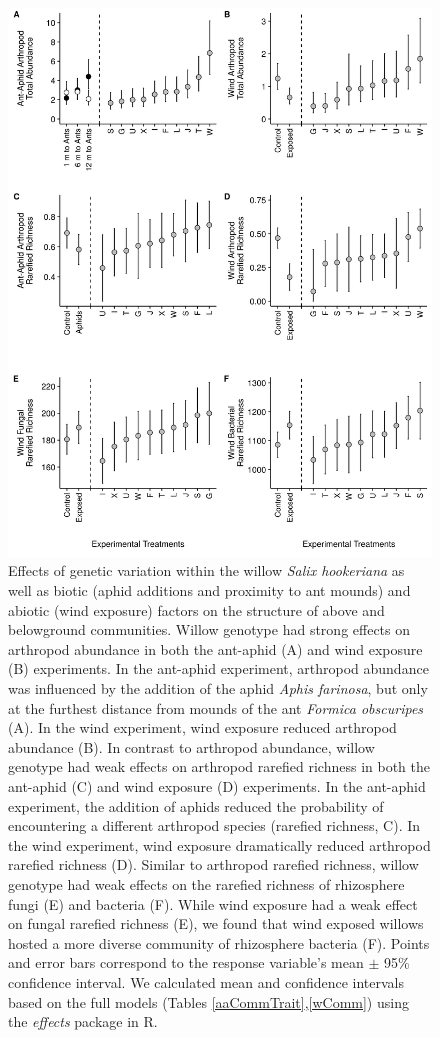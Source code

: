 \documentclass[11pt]{article}
\begin{document}
\begin{figure}%
\centering
\includegraphics[scale = 0.16]{fig_1.png}
\caption{Effects of genetic variation within the willow
\textit{Salix hookeriana} as well as biotic (aphid additions and proximity
to ant mounds) and abiotic (wind exposure) factors on the structure of
above and belowground communities. Willow genotype had strong effects on
arthropod abundance in both the ant-aphid (A) and wind exposure (B)
experiments. In the ant-aphid experiment, arthropod abundance was
influenced by the addition of the aphid \textit{Aphis farinosa}, but only
at the furthest distance from mounds of the ant \textit{Formica
obscuripes} (A). In the wind experiment, wind exposure reduced arthropod
abundance (B). In contrast to arthropod abundance, willow genotype had weak
effects on arthropod rarefied richness in both the ant-aphid (C) and
wind exposure (D) experiments. In the ant-aphid experiment, the
addition of aphids reduced the probability of encountering a different
arthropod species (rarefied richness, C). In the wind experiment, wind
exposure dramatically reduced arthropod rarefied richness (D). Similar to
arthropod rarefied richness, willow genotype had weak effects on the
rarefied richness of rhizosphere fungi (E) and bacteria (F). While wind
exposure had a weak effect on fungal rarefied richness (E), we found
that wind exposed willows hosted a more diverse community of rhizosphere
bacteria (F). Points and error bars correspond to the response
variable's mean $\pm$ 95\% confidence interval. We calculated mean and confidence intervals based on the full models (Tables \ref{aaCommTrait},\ref{wComm}) using the \textit{effects} package in R.}
\label{Fig:GxEuni}
\end{figure}
\end{document}

